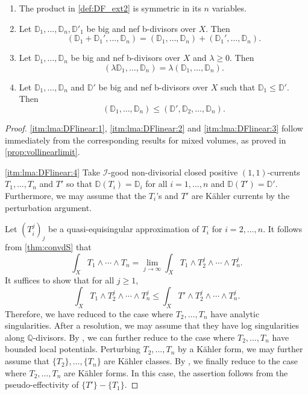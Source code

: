 \begin{lemma}\label{lma:DFlinear}\leavevmode
    \begin{enumerate}
        \item\label{itm:lma:DFlinear:1} The product in \cref{def:DF_ext2} is symmetric in its $n$ variables.
        \item\label{itm:lma:DFlinear:2} Let $\mathbb{D}_1,\ldots,\mathbb{D}_n,\mathbb{D}'_1$ be big and nef b-divisors over $X$. Then
        \[
        \left(\mathbb{D}_1+\mathbb{D}_1',\ldots,\mathbb{D}_n \right)=\left(\mathbb{D}_1,\ldots,\mathbb{D}_n \right)+\left(\mathbb{D}_1',\ldots,\mathbb{D}_n \right).
        \]
        \item\label{itm:lma:DFlinear:3} Let $\mathbb{D}_1,\ldots,\mathbb{D}_n$ be big and nef b-divisors over $X$ and $\lambda\geq 0$. Then
        \[
        \left(\lambda \mathbb{D}_1,\ldots,\mathbb{D}_n \right)=\lambda \left(\mathbb{D}_1,\ldots,\mathbb{D}_n \right).
        \]
        \item\label{itm:lma:DFlinear:4} Let $\mathbb{D}_1,\ldots,\mathbb{D}_n$ and $\mathbb{D}'$ be big and nef b-divisors over $X$ such that $\mathbb{D}_1\leq \mathbb{D}'$. Then
        \[
            \left(\mathbb{D}_1,\ldots,\mathbb{D}_n  \right)\leq \left(\mathbb{D}',\mathbb{D}_2,\ldots,\mathbb{D}_n  \right).
        \]
    \end{enumerate}
\end{lemma}
\begin{proof}
    \ref{itm:lma:DFlinear:1}, \ref{itm:lma:DFlinear:2} and \ref{itm:lma:DFlinear:3} follow immediately from the corresponding results for mixed volumes, as proved in \cref{prop:vollinearlimit}.

    \ref{itm:lma:DFlinear:4} Take $\mathcal{I}$-good non-divisorial closed positive $(1,1)$-currents $T_1,\ldots,T_n$ and $T'$ so that $\mathbb{D}(T_i)=\mathbb{D}_i$ for all $i=1,\ldots,n$ and $\mathbb{D}(T')=\mathbb{D}'$.
    Furthermore, we may assume that the $T_i$'s and $T'$ are Kähler currents by the perturbation argument.

    Let $(T_{i}^j)_j$ be a quasi-equisingular approximation of $T_i$ for $i=2,\ldots,n$. It follows from \cref{thm:convdS} that
    \[
    \int_X T_1\wedge \cdots \wedge T_n=\lim_{j\to\infty} \int_X T_1\wedge T_2^j\wedge\cdots \wedge T_n^j.
    \]
    It suffices to show that for all $j\geq 1$,
    \[
    \int_X T_1\wedge T_2^j\wedge\cdots \wedge T_n^j\leq \int_X T'\wedge T_2^j\wedge\cdots \wedge T_n^j.
    \]
    Therefore, we have reduced to the case where $T_2,\ldots,T_n$ have analytic singularities. After a resolution, we may assume that they have log singularities along $\mathbb{Q}$-divisors. By , we can further reduce to the case where $T_2,\ldots,T_n$ have bounded local potentials. Perturbing $T_2,\ldots,T_n$ by a Kähler form, we may further assume that $\{T_2\},\ldots, \{T_n\}$ are Kähler classes. By , we finally reduce to the case where $T_2,\ldots,T_n$ are Kähler forms. In this case, the assertion follows from the pseudo-effectivity of $\{T'\}-\{T_1\}$.
\end{proof}


